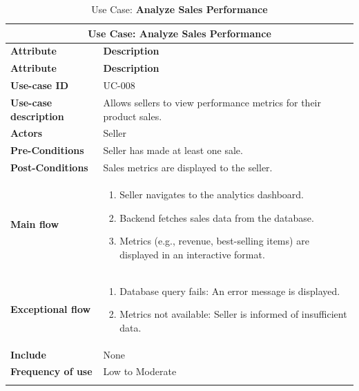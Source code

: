 \documentclass[12pt]{report}
\begin{document}
\begin{appendices}
	\begin{longtable}[H]{|l|p{9cm}||}
		\hline
		\multicolumn{2}{|c||}{\textbf{Use Case: Analyze Sales Performance}}                                                      \\
		\hline
		\textbf{Attribute}            & \textbf{Description}                                                                     \\
		\hline
		\endfirsthead
		\hline
		\textbf{Attribute}            & \textbf{Description}                                                                     \\
		\hline
		\endhead
		\textbf{Use-case ID}          & UC-008                                                                                   \\
		\hline
		\textbf{Use-case description} & Allows sellers to view performance metrics for their product sales.                      \\
		\hline
		\textbf{Actors}               & Seller                                                                                   \\
		\hline
		\textbf{Pre-Conditions}       & Seller has made at least one sale.                                                       \\
		\hline
		\textbf{Post-Conditions}      & Sales metrics are displayed to the seller.                                               \\
		\hline
		\textbf{Main flow}            & \begin{enumerate}
			                                \item Seller navigates to the analytics dashboard.
			                                \item Backend fetches sales data from the database.
			                                \item Metrics (e.g., revenue, best-selling items) are displayed in an interactive format.
		                                \end{enumerate} \\
		\hline
		\textbf{Exceptional flow}     & \begin{enumerate}
			                                \item Database query fails: An error message is displayed.
			                                \item Metrics not available: Seller is informed of insufficient data.
		                                \end{enumerate}                     \\
		\hline
		\textbf{Include}              & None                                                                                     \\
		\hline
		\textbf{Frequency of use}     & Low to Moderate                                                                          \\
		\hline
		\hline
		\caption{Use Case: \textbf{Analyze Sales Performance}}\label{tab:tableAnalyzeSales}
	\end{longtable}


\end{appendices}
\end{document}
